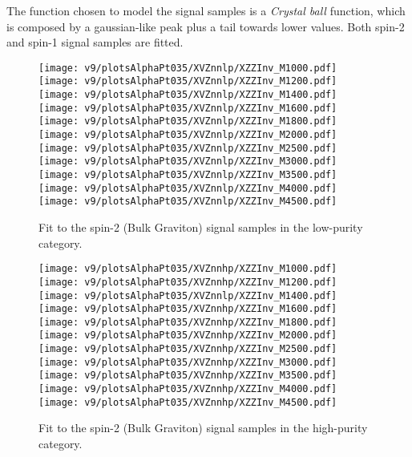 
The function chosen to model the signal samples is a \emph{Crystal ball} function, which is composed by a gaussian-like peak plus a tail towards lower values. Both spin-2 and spin-1 signal samples are fitted.


\begin{figure}[!htb]
  \centering
    \texttt{[image: v9/plotsAlphaPt035/XVZnnlp/XZZInv\_M1000.pdf]}
    \texttt{[image: v9/plotsAlphaPt035/XVZnnlp/XZZInv\_M1200.pdf]}
    \texttt{[image: v9/plotsAlphaPt035/XVZnnlp/XZZInv\_M1400.pdf]}
     \\
    \texttt{[image: v9/plotsAlphaPt035/XVZnnlp/XZZInv\_M1600.pdf]}
    \texttt{[image: v9/plotsAlphaPt035/XVZnnlp/XZZInv\_M1800.pdf]}
    \texttt{[image: v9/plotsAlphaPt035/XVZnnlp/XZZInv\_M2000.pdf]}
     \\
    \texttt{[image: v9/plotsAlphaPt035/XVZnnlp/XZZInv\_M2500.pdf]}
    \texttt{[image: v9/plotsAlphaPt035/XVZnnlp/XZZInv\_M3000.pdf]}
    \texttt{[image: v9/plotsAlphaPt035/XVZnnlp/XZZInv\_M3500.pdf]}
     \\
    \texttt{[image: v9/plotsAlphaPt035/XVZnnlp/XZZInv\_M4000.pdf]}
    \texttt{[image: v9/plotsAlphaPt035/XVZnnlp/XZZInv\_M4500.pdf]}
  \caption{Fit to the spin-2 (Bulk Graviton) signal samples in the low-purity category.}
  \label{fig:XVZnnlp_Signal}
\end{figure}


\begin{figure}[!htb]
  \centering
    \texttt{[image: v9/plotsAlphaPt035/XVZnnhp/XZZInv\_M1000.pdf]}
    \texttt{[image: v9/plotsAlphaPt035/XVZnnhp/XZZInv\_M1200.pdf]}
    \texttt{[image: v9/plotsAlphaPt035/XVZnnlp/XZZInv\_M1400.pdf]}
     \\
    \texttt{[image: v9/plotsAlphaPt035/XVZnnhp/XZZInv\_M1600.pdf]}
    \texttt{[image: v9/plotsAlphaPt035/XVZnnhp/XZZInv\_M1800.pdf]}
    \texttt{[image: v9/plotsAlphaPt035/XVZnnhp/XZZInv\_M2000.pdf]}
     \\
    \texttt{[image: v9/plotsAlphaPt035/XVZnnhp/XZZInv\_M2500.pdf]}
    \texttt{[image: v9/plotsAlphaPt035/XVZnnhp/XZZInv\_M3000.pdf]}
    \texttt{[image: v9/plotsAlphaPt035/XVZnnhp/XZZInv\_M3500.pdf]}
     \\
    \texttt{[image: v9/plotsAlphaPt035/XVZnnhp/XZZInv\_M4000.pdf]}
    \texttt{[image: v9/plotsAlphaPt035/XVZnnhp/XZZInv\_M4500.pdf]}
  \caption{Fit to the spin-2 (Bulk Graviton) signal samples in the high-purity category.}
  \label{fig:XVZnnhp_Signal}
\end{figure}


